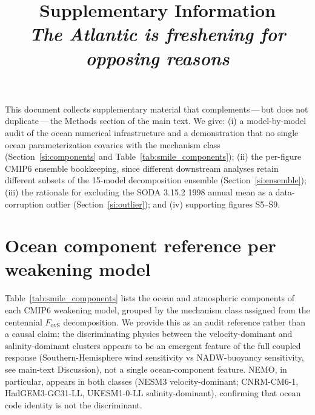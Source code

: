 \documentclass[10pt,a4paper]{article}
\title{Supplementary Information \\
       \textit{The Atlantic is freshening for opposing reasons}}
\date{}
\newcommand{\Fovs}{F_{\mathrm{ovS}}}
\begin{document}
\maketitle

This document collects supplementary material that complements\,---\,but does
not duplicate\,---\,the Methods section of the main text. We give:
(i) a model-by-model audit of the ocean numerical infrastructure and a
demonstration that no single ocean parameterization covaries with the
mechanism class (Section~\ref{si:components} and Table~\ref{tab:smile_components});
(ii) the per-figure CMIP6 ensemble bookkeeping, since different downstream
analyses retain different subsets of the 15-model decomposition ensemble
(Section~\ref{si:ensemble});
(iii) the rationale for excluding the SODA 3.15.2 1998 annual mean as a
data-corruption outlier (Section~\ref{si:outlier});
and (iv) supporting figures S5--S9.

\section*{Ocean component reference per weakening model}
\label{si:components}

Table~\ref{tab:smile_components} lists the ocean and atmospheric components
of each CMIP6 weakening model, grouped by the mechanism class assigned
from the centennial $\Fovs$ decomposition. We provide this as an audit
reference rather than a causal claim: the discriminating physics between
the velocity-dominant and salinity-dominant clusters appears to be an
emergent feature of the full coupled response (Southern-Hemisphere wind
sensitivity vs NADW-buoyancy sensitivity, see main-text Discussion), not
a single ocean-component feature. NEMO, in particular, appears in both
classes (NESM3 velocity-dominant; CNRM-CM6-1, HadGEM3-GC31-LL,
UKESM1-0-LL salinity-dominant), confirming that ocean code identity is
not the discriminant.
\end{document}
